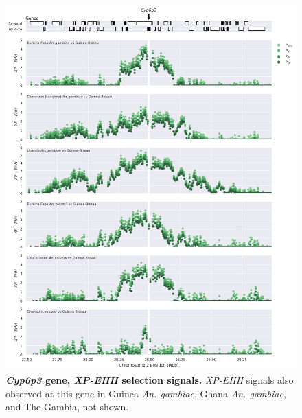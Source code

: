 \documentclass[a4paper,11pt,abstracton,hidelinks]{scrartcl}
\begin{document}
\begin{figure}[t!]
	\begin{center}
		\includegraphics*[width=1.1\linewidth,center]{artwork/locus_cyp6p3_xpehh.png}
	\end{center}
	\caption[\textit{Cyp6p3} gene, \textit{XP-EHH} selection signals]{
	\textbf{\textit{Cyp6p3} gene, \textit{XP-EHH} selection signals.}
	\textit{XP-EHH} signals also observed at this gene in Guinea \textit{An. gambiae}, Ghana \textit{An. gambiae}, and The Gambia, not shown. 
	} 
	\label{fig:locus_cyp6p3_xpehh}
\end{figure}
\end{document}
